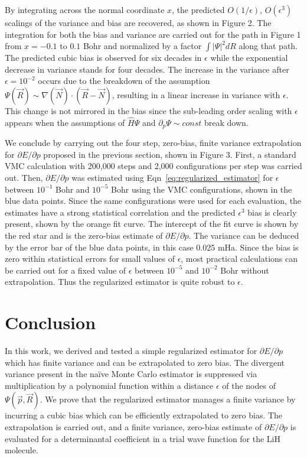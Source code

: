 \documentclass[twocolumn]{revtex4-1}
\begin{document}
By integrating across the normal coordinate $x$, the predicted $O(1/\epsilon)$, $O(\epsilon^3)$ scalings of the variance and bias are recovered, as shown in Figure 2.
The integration for both the bias and variance are carried out for the path in Figure 1 from $x = -0.1$ to $0.1$ Bohr and normalized by a factor $\int |\Psi|^2 dR$ along that path.
The predicted cubic bias is observed for six decades in $\epsilon$ while the exponential decrease in variance stands for four decades.
The increase in the variance after $\epsilon = 10^{-2}$ occurs due to the breakdown of the assumption $\Psi(\vec{R}) \sim \nabla(\vec{N}) \cdot (\vec{R}-\vec{N})$, resulting in a linear increase in variance with $\epsilon$.
This change is not mirrored in the bias since the sub-leading order scaling with $\epsilon$ appears when the assumptions of $\hat{H}\Psi$ and $\partial_p \Psi \sim const$ break down.

We conclude by carrying out the four step, zero-bias, finite variance extrapolation for $\partial E/\partial p$ proposed in the previous section, shown in Figure 3.
First, a standard VMC calculation with 200,000 steps and 2,000 configurations per step was carried out.
Then, $\partial E/\partial p$ was estimated using Eqn~\ref{eq:regularized_estimator} for $\epsilon$ between $10^{-1}$ Bohr and $10^{-5}$ Bohr using the VMC configurations, shown in the blue data points.
Since the same configurations were used for each evaluation, the estimates have a strong statistical correlation and the predicted $\epsilon^3$ bias is clearly present, shown by the orange fit curve.
The intercept of the fit curve is shown by the red star and is the zero-bias estimate of $\partial E/\partial p$.
The variance can be deduced by the error bar of the blue data points, in this case 0.025 mHa.
Since the bias is zero within statistical errors for small values of $\epsilon$, most practical calculations can be carried out for a fixed value of $\epsilon$ between $10^{-5}$ and $10^{-2}$ Bohr without extrapolation.
Thus the regularized estimator is quite robust to $\epsilon$.

\section{Conclusion}
In this work, we derived and tested a simple regularized estimator for $\partial E/\partial p$ which has finite variance and can be extrapolated to zero bias.
The divergent variance present in the na\"ive Monte Carlo estimator is suppressed via multiplication by a polynomial function within a distance $\epsilon$ of the nodes of $\Psi(\vec{p}, \vec{R})$. 
We prove that the regularized estimator manages a finite variance by incurring a cubic bias which can be efficiently extrapolated to zero bias.
The extrapolation is carried out, and a finite variance, zero-bias estimate of $\partial E/\partial p$ is evaluated for a determinantal coefficient in a trial wave function for the LiH molecule.
\end{document}
